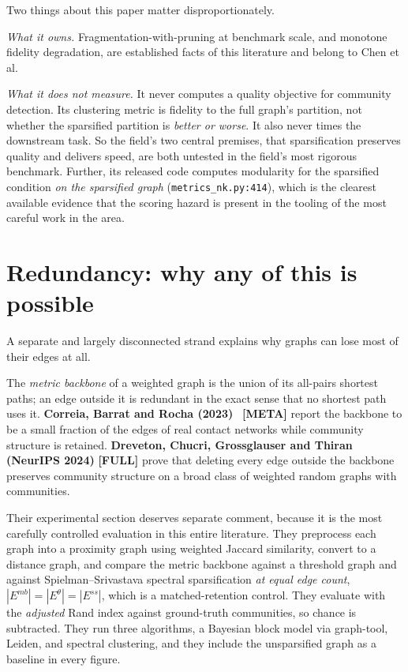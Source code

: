 \documentclass[10pt,a4paper]{article}
\begin{document}
Two things about this paper matter disproportionately.

\emph{What it owns.} Fragmentation-with-pruning at benchmark scale, and monotone fidelity
degradation, are established facts of this literature and belong to Chen et al.

\emph{What it does not measure.} It never computes a quality objective for community detection.
Its clustering metric is fidelity to the full graph's partition, not whether the sparsified
partition is \emph{better or worse}. It also never times the downstream task. So the field's two
central premises, that sparsification preserves quality and delivers speed, are both untested in
the field's most rigorous benchmark. Further, its released code computes modularity for the
sparsified condition \emph{on the sparsified graph}
(\texttt{metrics\_nk.py:414}), which is the clearest available evidence that the
scoring hazard is present in the tooling of the most careful work in the area.

\section{Redundancy: why any of this is possible}

A separate and largely disconnected strand explains why graphs can lose most of their edges at
all.

The \emph{metric backbone} of a weighted graph is the union of its all-pairs shortest paths; an
edge outside it is redundant in the exact sense that no shortest path uses it.
\textbf{Correia, Barrat and Rocha (2023)}~\cite{correia2023contact} \textbf{[META]} report the
backbone to be a small fraction of the edges of real contact networks while community structure
is retained. \textbf{Dreveton, Chucri, Grossglauser and Thiran (NeurIPS 2024)}
\cite{dreveton2024metric} \textbf{[FULL]} prove that deleting every edge outside the backbone
preserves community structure on a broad class of weighted random graphs with communities.

Their experimental section deserves separate comment, because it is the most carefully controlled
evaluation in this entire literature. They preprocess each graph into a proximity graph using
weighted Jaccard similarity, convert to a distance graph, and compare the metric backbone against
a threshold graph and against Spielman--Srivastava spectral sparsification \emph{at equal edge
count}, $|E^{mb}| = |E^{\theta}| = |E^{ss}|$, which is a matched-retention control. They evaluate
with the \emph{adjusted} Rand index against ground-truth communities, so chance is subtracted.
They run three algorithms, a Bayesian block model via graph-tool, Leiden, and spectral clustering,
and they include the unsparsified graph as a baseline in every figure.
\end{document}
